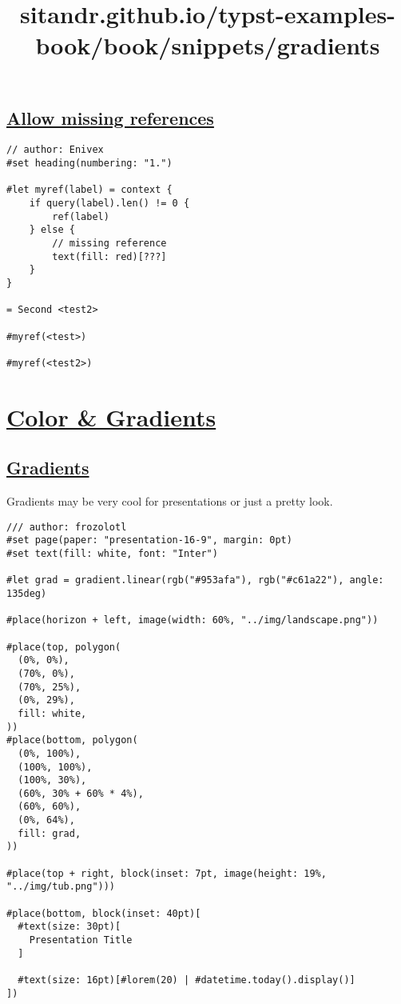 \subsection{\texorpdfstring{\hyperref[allow-missing-references]{Allow
missing
references}}{Allow missing references}}\label{allow-missing-references}

\begin{verbatim}
// author: Enivex
#set heading(numbering: "1.")

#let myref(label) = context {
    if query(label).len() != 0 {
        ref(label)
    } else {
        // missing reference
        text(fill: red)[???]
    }
}

= Second <test2>

#myref(<test>)

#myref(<test2>)
\end{verbatim}

\pandocbounded{}


\title{sitandr.github.io/typst-examples-book/book/snippets/gradients}

\section{\texorpdfstring{\hyperref[color--gradients]{Color \&
Gradients}}{Color \& Gradients}}\label{color--gradients}

\subsection{\texorpdfstring{\hyperref[gradients]{Gradients}}{Gradients}}\label{gradients}

Gradients may be very cool for presentations or just a pretty look.

\begin{verbatim}
/// author: frozolotl
#set page(paper: "presentation-16-9", margin: 0pt)
#set text(fill: white, font: "Inter")

#let grad = gradient.linear(rgb("#953afa"), rgb("#c61a22"), angle: 135deg)

#place(horizon + left, image(width: 60%, "../img/landscape.png"))

#place(top, polygon(
  (0%, 0%),
  (70%, 0%),
  (70%, 25%),
  (0%, 29%),
  fill: white,
))
#place(bottom, polygon(
  (0%, 100%),
  (100%, 100%),
  (100%, 30%),
  (60%, 30% + 60% * 4%),
  (60%, 60%),
  (0%, 64%),
  fill: grad,
))

#place(top + right, block(inset: 7pt, image(height: 19%, "../img/tub.png")))

#place(bottom, block(inset: 40pt)[
  #text(size: 30pt)[
    Presentation Title
  ]

  #text(size: 16pt)[#lorem(20) | #datetime.today().display()]
])
\end{verbatim}

